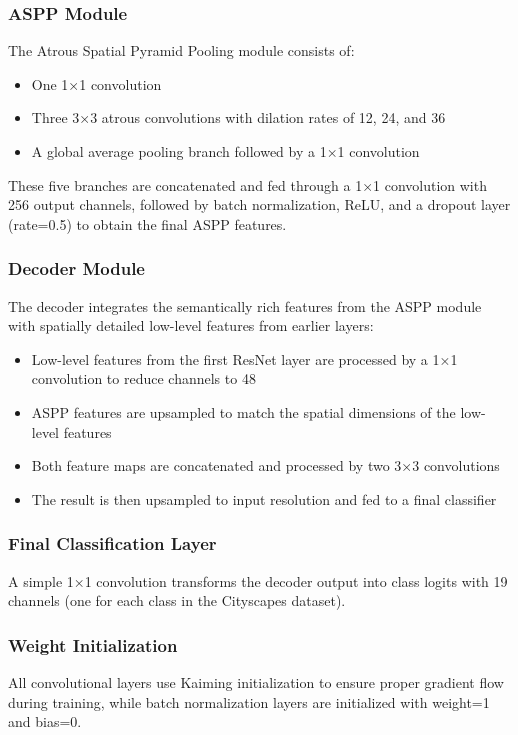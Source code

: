 \documentclass[]{article}
\begin{document}
\subsubsection{ASPP Module}
The Atrous Spatial Pyramid Pooling module consists of:
\begin{itemize}
    \item One 1×1 convolution
    \item Three 3×3 atrous convolutions with dilation rates of 12, 24, and 36
    \item A global average pooling branch followed by a 1×1 convolution
\end{itemize}

These five branches are concatenated and fed through a 1×1 convolution with 256 output channels, followed by batch normalization, ReLU, and a dropout layer (rate=0.5) to obtain the final ASPP features.

\subsubsection{Decoder Module}
The decoder integrates the semantically rich features from the ASPP module with spatially detailed low-level features from earlier layers:
\begin{itemize}
    \item Low-level features from the first ResNet layer are processed by a 1×1 convolution to reduce channels to 48
    \item ASPP features are upsampled to match the spatial dimensions of the low-level features
    \item Both feature maps are concatenated and processed by two 3×3 convolutions
    \item The result is then upsampled to input resolution and fed to a final classifier
\end{itemize}

\subsubsection{Final Classification Layer}
A simple 1×1 convolution transforms the decoder output into class logits with 19 channels (one for each class in the Cityscapes dataset).

\subsubsection{Weight Initialization}
All convolutional layers use Kaiming initialization to ensure proper gradient flow during training, while batch normalization layers are initialized with weight=1 and bias=0.
\end{document}
